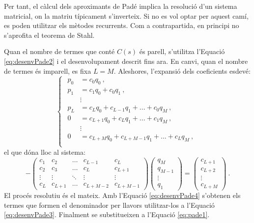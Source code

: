 Per tant, el càlcul dels aproximants de Padé implica la resolució d'un sistema matricial, on la matriu típicament s'inverteix. Si no es vol optar per aquest camí, es poden utilitzar els mètodes recurrents. Com a contrapartida, en principi no s'aprofita el teorema de Stahl. 

Quan el nombre de termes que conté $C(s)$ és parell, s'utilitza l'Equació \ref{eq:desenvPade2} i el desenvolupament descrit fins ara. En canvi, quan el nombre de termes és imparell, es fixa $L=M$. Aleshores, l'expansió dels coeficients esdevé:
\begin{equation}
    \begin{cases}
    \begin{split}
        p_0 &= c_0q_0\ ,\\
        p_1 &= c_1q_0 + c_0q_1\ ,\\
        &\vdots\\
        p_L&=c_Lq_0+c_{L-1}q_1+...+c_0q_M\ ,\\
        0&=c_{L+1}q_0+c_{L}q_1+...+c_1q_M\ ,\\
        &\vdots\\
        0&=c_{L+M}q_0+c_{L+M-1}q_1+...+c_Lq_M\ ,\\
    \end{split}
\end{cases}
    \label{eq:desenvPade3}
\end{equation}
el que dóna lloc al sistema:
\begin{equation}
    -\begin{pmatrix}
         c_{1} & c_2 & \dots & c_{L-1} & c_{L}\\
         c_{2} & c_{3} & \dots & c_{L} & c_{L+1}\\
         \vdots & \vdots & \ddots & \vdots & \vdots\\
         c_{L} & c_{L+1} & \dots & c_{L+M-2} & c_{L+M-1}
     \end{pmatrix}
     \begin{pmatrix}
         q_M\\
         q_{M-1}\\
         \vdots\\
         q_1
     \end{pmatrix}
     =
     \begin{pmatrix}
         c_{L+1}\\
         c_{L+2}\\
         \vdots\\
         c_{L+M}
     \end{pmatrix}\ .
     \label{eq:desenvPade4}
 \end{equation}
 El procés resolutiu és el mateix. Amb l'Equació \ref{eq:desenvPade4} s'obtenen els termes que formen el denominador per llavors utilitzar-los a l'Equació \ref{eq:desenvPade3}. Finalment se substitueixen a l'Equació \ref{eq:pade1}. 

